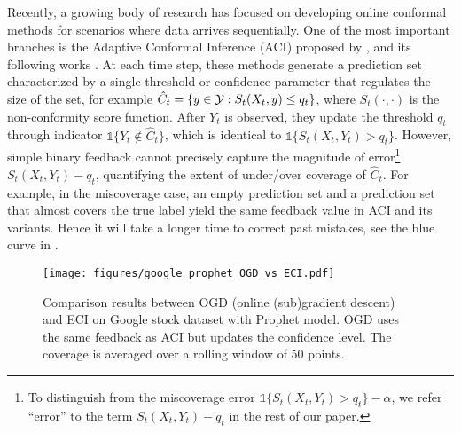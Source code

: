 Recently, a growing body of research has focused on developing online conformal methods for scenarios where data arrives sequentially. One of the most important branches is the Adaptive Conformal Inference (ACI) proposed by \cite{aci_gibbs2021adaptive}, and its following works \citep{zaffran2022adaptive,bhatnagar2023improved,gibbs2024conformal}. At each time step, these methods generate a prediction set characterized by a single threshold or confidence parameter that regulates the size of the set, for example $\hat{C}_t = \{y\in {\mathcal{Y}}: S_t(X_t, y) \leq q_t\}$, where $S_t(\cdot,\cdot)$ is the non-conformity score function. After $Y_t$ is observed, they update the threshold $q_t$ through indicator $\mathds{1}\{Y_t \notin \hat{C}_t\}$, which is identical to $\mathds{1}\{S_t(X_t,Y_t) > q_t\}$. However, simple binary feedback cannot precisely capture the magnitude of error\footnote{To distinguish from the miscoverage error $\mathds{1}\{S_t(X_t,Y_t) > q_t\}-\alpha$, we refer ``error'' to the term $S_t(X_t,Y_t) - q_t$ in the rest of our paper.} $S_t(X_t,Y_t) - q_t$, quantifying the extent of under/over coverage of $\hat{C}_t$. For example, in the miscoverage case, an empty prediction set and a prediction set that almost covers the true label yield the same feedback value in ACI and its variants. Hence it will take a longer time to correct past mistakes, see the blue curve in .


\vspace{-1em}
\begin{figure*}[ht]
  \centering
  \texttt{[image: figures/google\_prophet\_OGD\_vs\_ECI.pdf]}
  \vspace{-0.5em}
  \caption{Comparison results between OGD (online (sub)gradient descent) and ECI on Google stock dataset with Prophet model. OGD uses the same feedback as ACI but updates the confidence level. The coverage is averaged over a rolling window of 50 points.
  \vspace{-1em}
}
  \label{figure google prophet ogd vs eci}
\end{figure*}

